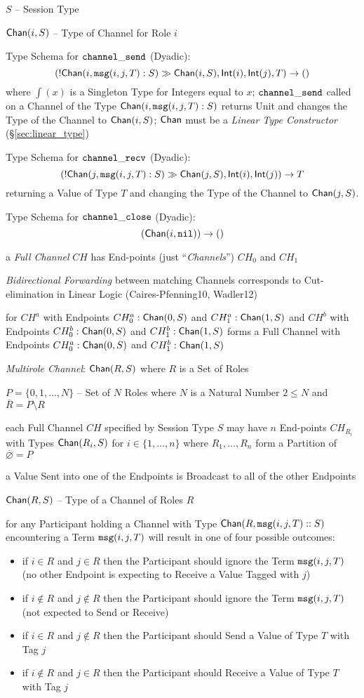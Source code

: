 $S$ -- Session Type

$\mathsf{Chan}(i,S)$ -- Type of Channel for Role $i$

Type Schema for $\mathtt{channel\_send}$ (Dyadic):
\[
  (!\mathsf{Chan} (i, \mathtt{msg}(i,j,T):S) \gg \mathsf{Chan}(i,S), \mathsf{Int}(i), \mathsf{Int}(j), T)
    \rightarrow \mathsf{()}
\]
where $\int(x)$ is a Singleton Type for Integers equal to $x$;
$\mathtt{channel\_send}$ called on a Channel of the Type
$\mathsf{Chan}(i, \mathtt{msg}(i,j,T):S)$ returns Unit and changes the
Type of the Channel to $\mathsf{Chan}(i,S)$; $\mathsf{Chan}$ must be a
\emph{Linear Type Constructor} (\S\ref{sec:linear_type})

Type Schema for $\mathtt{channel\_recv}$ (Dyadic):
\[
  (!\mathsf{Chan} (j, \mathtt{msg}(i,j,T):S) \gg \mathsf{Chan}(j,S), \mathsf{Int}(i), \mathsf{Int}(j))
    \rightarrow T
\]
returning a Value of Type $T$ and changing the Type of the Channel to
$\mathsf{Chan}(j,S)$.

Type Schema for $\mathtt{channel\_close}$ (Dyadic):
\[
  (\mathsf{Chan}(i, \mathtt{nil})) \rightarrow \mathsf{()}
\]

a \emph{Full Channel} $CH$ has End-points (just ``\emph{Channels}'')
$CH_0$ and $CH_1$


\emph{Bidirectional Forwarding} between matching Channels corresponds
to Cut-elimination in Linear Logic (Caires-Pfenning10, Wadler12)

for $CH^a$ with Endpoints $CH^a_0 : \mathsf{Chan}(0,S)$ and $CH^a_1 :
\mathsf{Chan}(1,S)$ and $CH^b$ with Endpoints $CH^b_0 : \mathsf{Chan}(0,S)$ and
$CH^b_1 : \mathsf{Chan}(1,S)$ forms a Full Channel with Endpoints $CH^a_0 :
\mathsf{Chan}(0,S)$ and $CH^b_1 : \mathsf{Chan}(1,S)$


\emph{Multirole Channel}: $\mathsf{Chan}(R,S)$ where $R$ is a Set of Roles

$P = \{0, 1, \ldots, N\}$ -- Set of $N$ Roles where $N$ is a Natural
Number $2 \leq N$ and $\overline{R} = P \setminus R$

each Full Channel $CH$ specified by Session Type $S$ may have $n$
End-points $CH_{R_i}$ with Types $\mathsf{Chan}(R_i,S)$ for $i \in
\{1,\ldots,n\}$ where $R_1, \ldots, R_n$ form a Partition of
$\overline{\varnothing} = P$

a Value Sent into one of the Endpoints is Broadcast to all of the
other Endpoints

$\mathsf{Chan}(R,S)$ -- Type of a Channel of Roles $R$

for any Participant holding a Channel with Type $\mathsf{Chan}(R,
\mathtt{msg}(i,j,T)::S)$ encountering a Term $\mathtt{msg}(i,j,T)$ will result in one
of four possible outcomes:
\begin{itemize}
  \item if $i \in R$ and $j \in R$ then the Participant should ignore
    the Term $\mathtt{msg}(i,j,T)$ (no other Endpoint is expecting to Receive
    a Value Tagged with $j$)
  \item if $i \notin R$ and $j \notin R$ then the Participant should
    ignore the Term $\mathtt{msg}(i,j,T)$ (not expected to Send or Receive)
  \item if $i \in R$ and $j \notin R$ then the Participant should Send
    a Value of Type $T$ with Tag $j$
  \item if $i \notin R$ and $j \in R$ then the Participant should
    Receive a Value of Type $T$ with Tag $j$
\end{itemize}


